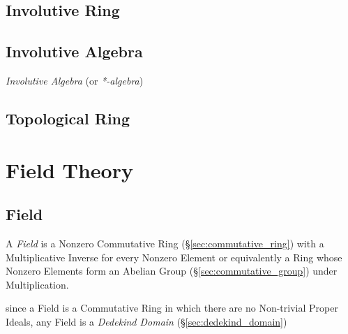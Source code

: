 \subsection{Involutive Ring}\label{sec:involutive_ring}

\subsection{Involutive Algebra}\label{sec:involutive_algebra}

\emph{Involutive Algebra} (or \emph{*-algebra})



\subsection{Topological Ring}\label{sec:topological_ring}



\section{Field Theory}\label{sec:field_theory}

\subsection{Field}\label{sec:field}

A \emph{Field} is a Nonzero Commutative Ring (\S\ref{sec:commutative_ring}) with
a Multiplicative Inverse for every Nonzero Element or equivalently a Ring whose
Nonzero Elements form an Abelian Group (\S\ref{sec:commutative_group}) under
Multiplication.

since a Field is a Commutative Ring in which there are no Non-trivial Proper
Ideals, any Field is a \emph{Dedekind Domain} (\S\ref{sec:dedekind_domain})

